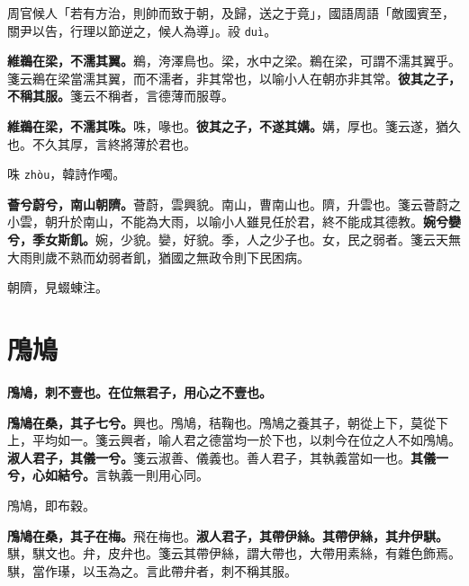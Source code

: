 \begin{quoting}周官候人「若有方治，則帥而致于朝，及歸，送之于竟」，國語周語「敵國賓至，關尹以告，行理以節逆之，候人為導」。祋 \texttt{duì}。\end{quoting}

\textbf{維鵜在梁，不濡其翼。}{\footnotesize 鵜，洿澤鳥也。梁，水中之梁。鵜在梁，可謂不濡其翼乎。箋云鵜在梁當濡其翼，而不濡者，非其常也，以喻小人在朝亦非其常。}\textbf{彼其之子，不稱其服。}{\footnotesize 箋云不稱者，言德薄而服尊。}

\textbf{維鵜在梁，不濡其咮。}{\footnotesize 咮，喙也。}\textbf{彼其之子，不遂其媾。}{\footnotesize 媾，厚也。箋云遂，猶久也。不久其厚，言終將薄於君也。}

\begin{quoting}咮 \texttt{zhòu}，韓詩作噣。\end{quoting}

\textbf{薈兮蔚兮，南山朝隮。}{\footnotesize 薈蔚，雲興貌。南山，曹南山也。隮，升雲也。箋云薈蔚之小雲，朝升於南山，不能為大雨，以喻小人雖見任於君，終不能成其德教。}\textbf{婉兮孌兮，季女斯飢。}{\footnotesize 婉，少貌。孌，好貌。季，人之少子也。女，民之弱者。箋云天無大雨則歲不熟而幼弱者飢，猶國之無政令則下民困病。}

\begin{quoting}朝隮，見蝃蝀注。\end{quoting}

\section{鳲鳩}


\textbf{鳲鳩，刺不壹也。在位無君子，用心之不壹也。}{\footnotesize }

\textbf{鳲鳩在桑，其子七兮。}{\footnotesize 興也。鳲鳩，秸鞠也。鳲鳩之養其子，朝從上下，莫從下上，平均如一。箋云興者，喻人君之德當均一於下也，以刺今在位之人不如鳲鳩。}\textbf{淑人君子，其儀一兮。}{\footnotesize 箋云淑善、儀義也。善人君子，其執義當如一也。}\textbf{其儀一兮，心如結兮。}{\footnotesize 言執義一則用心同。}

\begin{quoting}鳲鳩，即布穀。\end{quoting}

\textbf{鳲鳩在桑，其子在梅。}{\footnotesize 飛在梅也。}\textbf{淑人君子，其帶伊絲。其帶伊絲，其弁伊騏。}{\footnotesize 騏，騏文也。弁，皮弁也。箋云其帶伊絲，謂大帶也，大帶用素絲，有雜色飾焉。騏，當作𤪌，以玉為之。言此帶弁者，刺不稱其服。}

